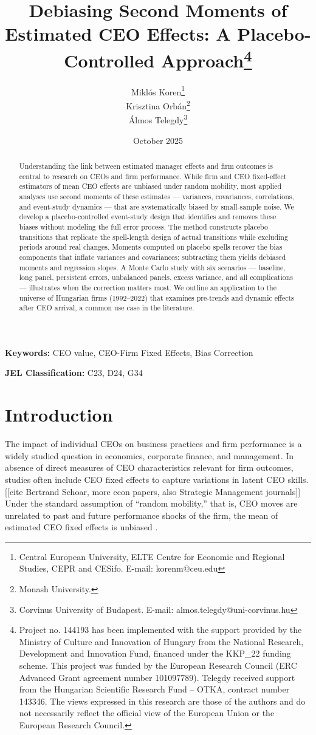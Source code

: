 \documentclass[11pt,a4paper]{article}
\title{Debiasing Second Moments of Estimated CEO Effects: A Placebo-Controlled Approach\thanks{Project no. 144193 has been implemented with the support provided by the Ministry of Culture and Innovation of Hungary from the National Research, Development and Innovation Fund, financed under the KKP\_22 funding scheme. This project was funded by the European Research Council (ERC Advanced Grant agreement number 101097789). Telegdy received support from the Hungarian Scientific Research Fund – OTKA, contract number 143346. The views expressed in this research are those of the authors and do not necessarily reflect the official view of the European Union or the European Research Council.}}
\author{Miklós Koren\thanks{Central European University, ELTE Centre for Economic and Regional Studies, CEPR and CESifo. E-mail: korenm@ceu.edu} \\
        Krisztina Orbán\thanks{Monash University.} \\
        Álmos Telegdy\thanks{Corvinus University of Budapest. E-mail: almos.telegdy@uni-corvinus.hu}}
\date{October 2025}
\begin{document}
\maketitle
\thispagestyle{empty}

\begin{abstract}
Understanding the link between estimated manager effects and firm outcomes is central to research on CEOs and firm performance. While firm and CEO fixed-effect estimators of mean CEO effects are unbiased under random mobility, most applied analyses use second moments of these estimates — variances, covariances, correlations, and event-study dynamics — that are systematically biased by small-sample noise. We develop a placebo-controlled event-study design that identifies and removes these biases without modeling the full error process. The method constructs placebo transitions that replicate the spell-length design of actual transitions while excluding periods around real changes. Moments computed on placebo spells recover the bias components that inflate variances and covariances; subtracting them yields debiased moments and regression slopes. A Monte Carlo study with six scenarios — baseline, long panel, persistent errors, unbalanced panels, excess variance, and all complications — illustrates when the correction matters most. We outline an application to the universe of Hungarian firms (1992--2022) that examines pre-trends and dynamic effects after CEO arrival, a common use case in the literature.
\end{abstract}

\textbf{Keywords:} CEO value, CEO-Firm Fixed Effects, Bias Correction

\textbf{JEL Classification:} C23, D24, G34

\clearpage
\setcounter{page}{1}

\section{Introduction}

The impact of individual CEOs on business practices and firm performance is a widely studied question in economics, corporate finance, and management. In absence of direct measures of CEO characteristics relevant for firm outcomes, studies often include CEO fixed effects to capture variations in latent CEO skills. [[cite Bertrand Schoar, more econ papers, also Strategic Management journals]] Under the standard assumption of ``random mobility,'' that is, CEO moves are unrelated to past and future performance shocks of the firm, the mean of estimated CEO fixed effects is unbiased \citep{}. 
\end{document}
